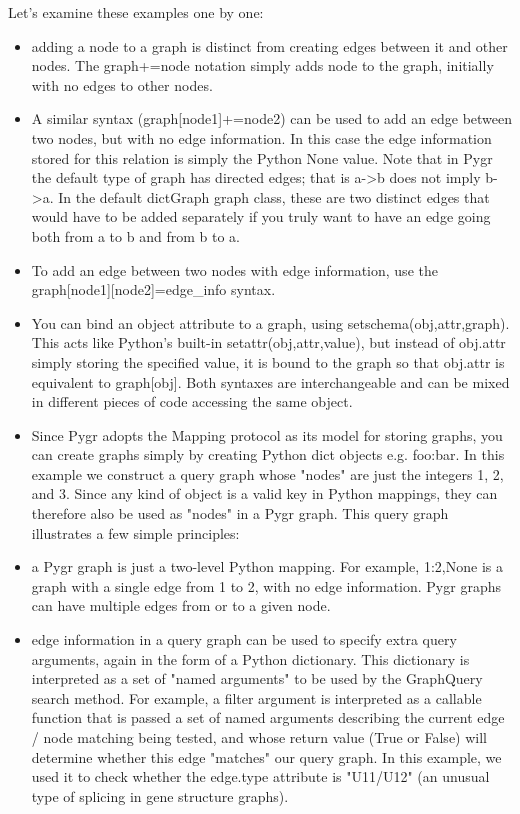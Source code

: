 \documentclass{howto}
\begin{document}
Let's examine these examples one by one:
\begin{itemize}

\item
adding a node to a graph is distinct from creating edges between it and other nodes.  The graph+=node notation simply adds node to the graph, initially with no edges to other nodes.

\item 
A similar syntax (graph[node1]+=node2) can be used to add an edge between two nodes, but with no edge information.  In this case the edge information stored for this relation is simply the Python None value.  Note that in Pygr the default type of graph has directed edges; that is a->b does not imply b->a.  In the default dictGraph graph class, these are two distinct edges that would have to be added separately if you truly want to have an edge going both from a to b and from b to a.

\item 
To add an edge between two nodes with edge information, use the graph[node1][node2]=edge_info syntax. 

\item 
You can bind an object attribute to a graph, using setschema(obj,attr,graph).  This acts like Python's built-in setattr(obj,attr,value), but instead of obj.attr simply storing the specified value, it is bound to the graph so that obj.attr is equivalent to graph[obj].  Both syntaxes are interchangeable and can be mixed in different pieces of code accessing the same object.

\item 
Since Pygr adopts the Mapping protocol as its model for storing graphs, you can create graphs simply by creating Python dict objects e.g. {foo:bar}.  In this example we construct a query graph whose "nodes" are just the integers 1, 2, and 3.  Since any kind of object is a valid key in Python mappings, they can therefore also be used as "nodes" in a Pygr graph.  This query graph illustrates a few simple principles:

\item 
a Pygr graph is just a two-level Python mapping.  For example, {1:{2,None}} is a graph with a single edge from 1 to 2, with no edge information.  Pygr graphs can have multiple edges from or to a given node. 

\item    
edge information in a query graph can be used to specify extra query arguments, again in the form of a Python dictionary.  This dictionary is interpreted as a set of "named arguments" to be used by the GraphQuery search method.  For example, a filter argument is interpreted as a callable function that is passed a set of named arguments describing the current edge / node matching being tested, and whose return value (True or False) will determine whether this edge "matches" our query graph.  In this example, we used it to check whether the edge.type attribute is "U11/U12" (an unusual type of splicing in gene structure graphs).


\end{itemize}
\end{document}
